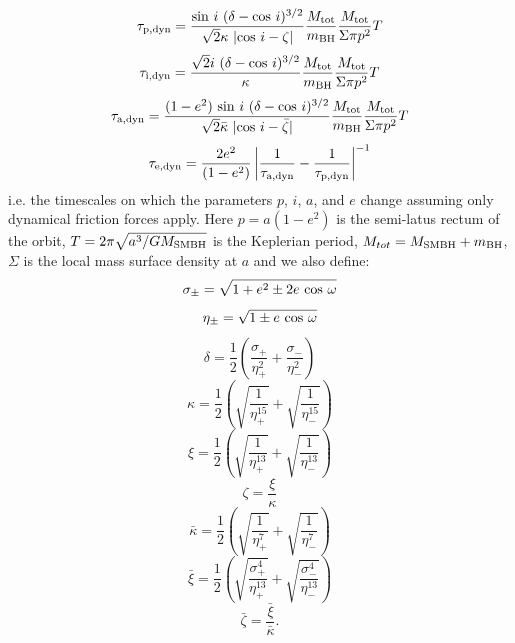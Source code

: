\begin{equation}
    \tau_{\rm p,dyn} = \frac {{\rm sin}~i~(\delta - {\rm cos}~i)^{3/2}}{\sqrt{2} \kappa ~| {\rm cos}~i - \zeta |} \frac{M_\mathrm{tot}}{m_{\rm BH}} \frac{M_\mathrm{tot}}{\Sigma \pi p^{2}} T
\end{equation}
\begin{equation}
    \tau_{\rm i,dyn} = \frac {\sqrt{2} i~(\delta - {\rm cos}~i)^{3/2}}{\kappa} \frac{M_\mathrm{tot}}{m_{\rm BH}} \frac{M_\mathrm{tot}}{\Sigma \pi p^{2}} T
\end{equation}
\begin{equation}
    \tau_{\rm a,dyn} = \frac {(1-e^2)~{\rm sin}~i~(\delta - {\rm cos}~i)^{3/2}}{\sqrt{2} \bar\kappa~| {\rm cos}~i - \bar\zeta |} \frac{M_\mathrm{tot}}{m_{\rm BH}} \frac{M_\mathrm{tot}}{\Sigma \pi p^{2}} T
\end{equation}
\begin{equation}
    \tau_{\rm e,dyn} = \frac{2e^2}{(1-e^2)} \left| \frac{1}{\tau_{\rm a,dyn}}-\frac{1}{\tau_{\rm p,dyn}} \right|^{-1}
\end{equation}
i.e. the timescales on which the parameters $p$, $i$, $a$, and $e$ change assuming only dynamical friction forces apply.
Here $p=a(1-e^2)$ is the semi-latus rectum of the orbit, $T=2\pi \sqrt{a^3/GM_{\rm SMBH}}$ is the Keplerian period, $M_{tot}=M_{\rm SMBH} + m_{\rm BH}$, $\Sigma$ is the local mass surface density at $a$ and we also define:
\begin{equation}
    \sigma_{\pm} = \sqrt{1+e^2 \pm 2e~ {\rm cos} ~\omega}
\end{equation}
\begin{equation}
    \eta_{\pm} = \sqrt{1 \pm e~ {\rm cos}~ \omega}
\end{equation}
\begin{equation}
    \delta = \frac{1}{2} \left( \frac{\sigma_{+}}{\eta^2_{+}} + \frac{\sigma_{-}}{\eta^2_{-}} \right)
\end{equation}
\begin{equation}
    \kappa = \frac{1}{2} \left( \sqrt{\frac{1}{\eta_{+}^{15}}} + \sqrt{\frac{1}{\eta_{-}^{15}}} \right)
\end{equation}
\begin{equation}
    \xi = \frac{1}{2} \left( \sqrt{\frac{1}{\eta_{+}^{13}}} + \sqrt{\frac{1}{\eta_{-}^{13}}} \right)
\end{equation}
\begin{equation}
    \zeta = \frac{\xi}{\kappa}
\end{equation}
\begin{equation}
    \bar\kappa = \frac{1}{2} \left( \sqrt{\frac{1}{\eta_{+}^{7}}} + \sqrt{\frac{1}{\eta_{-}^{7}}} \right)
\end{equation}
\begin{equation}
    \bar\xi = \frac{1}{2} \left( \sqrt{\frac{\sigma_{+}^4}{\eta_{+}^{13}}} + \sqrt{\frac{\sigma_{-}^4}{\eta_{-}^{13}}} \right)
\end{equation}
\begin{equation}
    \bar\zeta = \frac{\bar\xi}{\bar\kappa}.
\end{equation}

